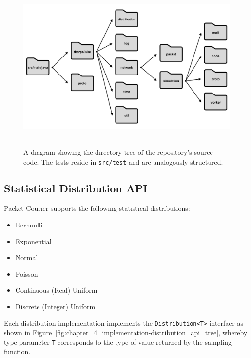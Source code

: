 \begin{figure}[!h]
    \includegraphics[width=\textwidth]{images/chapter_4_implementation/repository_structure}
    \centering~\caption{A diagram showing the directory tree of the repository's source code. The tests reside in
    \texttt{src/test} and are analogously structured.}
    \label{fig:chapter_4_implementation-repository_structure}
\end{figure}

\subsection{Statistical Distribution API}\label{subsection:statistical_distribution_api}

Packet Courier supports the following statistical distributions:
\begin{itemize}
    \item Bernoulli
    \item Exponential
    \item Normal
    \item Poisson
    \item Continuous (Real) Uniform
    \item Discrete (Integer) Uniform
\end{itemize}

Each distribution implementation implements the \texttt{Distribution<T>} interface as shown in
Figure~\ref{fig:chapter_4_implementation-distribution_api_tree}, whereby type parameter \texttt{T} corresponds to the
type of value returned by the sampling function.

